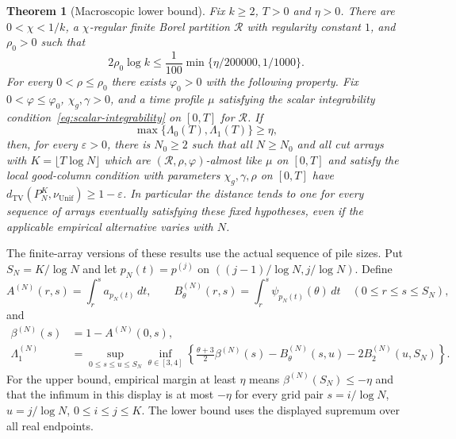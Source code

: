 \documentclass[11pt]{article}
\numberwithin{equation}{section}
\newtheorem{theorem}{Theorem}[section]
\theoremstyle{definition}
\theoremstyle{remark}
\newcommand{\TV}{\mathrm{TV}}
\newcommand{\Unif}{\mathrm{Unif}}
\newcommand{\dTV}{d_{\TV}}
\newcommand{\nuUnif}{\nu_{\Unif}}
\newcommand{\1}{\mathbf 1}
\begin{document}
\begin{theorem}[Macroscopic lower bound]%
\label{thm:macroscopic-lower}
Fix $k\ge2$, $T>0$ and $\eta>0$. There are $0<\chi<1/k$, a $\chi$-regular finite Borel
partition $\mathcal R$ with regularity constant $1$, and $\rho_0>0$ such that
\[
 2\rho_0\log k\le\frac1{100}\min\{\eta/200000,1/1000\}.
\]
For every $0<\rho\le\rho_0$ there exists $\varphi_0>0$ with the following
property. Fix $0<\varphi\le\varphi_0$, $\chi_g,\gamma>0$, and a time
profile $\mu$ satisfying the scalar integrability condition~\eqref{eq:scalar-integrability} on $[0,T]$ for $\mathcal R$. If
\[
 \max\{\Lambda_0(T),\Lambda_1(T)\}\ge\eta,
\]
then, for every $\varepsilon>0$, there is $N_0\ge2$ such that all
$N\ge N_0$ and all cut arrays with $K=\lfloor T\log N\rfloor$ which are
$(\mathcal R,\rho,\varphi)$-almost like $\mu$ on $[0,T]$ and satisfy the local
good-column condition with parameters $\chi_g,\gamma,\rho$ on $[0,T]$
have $\dTV(P_N^K,\nuUnif)\ge1-\varepsilon$. In particular the distance
tends to one for every sequence of arrays eventually satisfying these
fixed hypotheses, even if the applicable empirical alternative varies
with $N$.
\end{theorem}

The finite-array versions of these results use the actual sequence of
pile sizes. Put $S_N=K/\log N$ and let $p_N(t)=p^{(j)}$ on
$((j-1)/\log N,j/\log N)$. Define
\[
 A^{(N)}(r,s)=\int_r^s a_{p_N(t)}\,dt,\qquad
 B^{(N)}_\theta(r,s)=\int_r^s\psi_{p_N(t)}(\theta)\,dt
 \quad(0\le r\le s\le S_N),
\]
and
\begin{align*}
 \beta^{(N)}(s)&=1-A^{(N)}(0,s),\\
 \Lambda_1^{(N)}&=\sup_{0\le s\le u\le S_N}\inf_{\theta\in[3,4]}
 \left\{\frac{\theta+3}{2}\beta^{(N)}(s)
       -B^{(N)}_\theta(s,u)-2B^{(N)}_2(u,S_N)\right\}.
\end{align*}
For the upper bound, empirical margin at least $\eta$ means
$\beta^{(N)}(S_N)\le-\eta$ and that the infimum in this display
is at most $-\eta$ for every grid pair
$s=i/\log N$, $u=j/\log N$, $0\le i\le j\le K$.
The lower bound uses the displayed supremum over all real endpoints.
\end{document}
